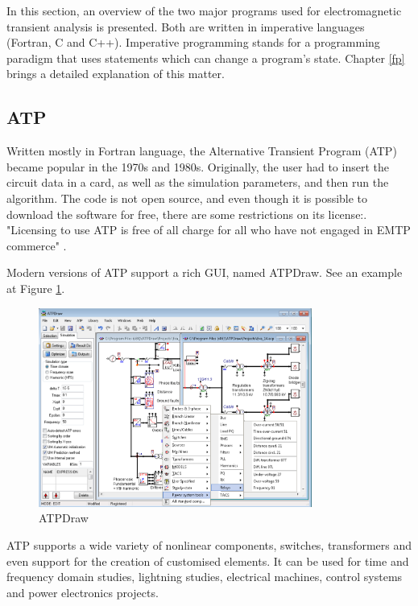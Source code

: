 In this section, an overview of the two major programs used for electromagnetic transient analysis is presented. Both are written in imperative languages (Fortran, C and C++). Imperative programming stands for a programming paradigm that uses statements which can change a program's state. Chapter \ref{fp} brings a detailed explanation of this matter.

\subsection{ATP}

Written mostly in Fortran language, the Alternative Transient Program (ATP) \cite{atpsite} became popular in the 1970s and 1980s. Originally, the user had to insert the circuit data in a card, as well as the simulation parameters, and then run the algorithm. The code is not open source, and even though it is possible to download the software for free, there are some restrictions on its license:. "Licensing to use ATP is free of all charge for all who have not engaged in EMTP commerce" \cite{atplic}. 

Modern versions of ATP support a rich GUI, named ATPDraw. See an example at Figure \ref{atpdraw}.

\begin{figure}[H]
   \centering
   \includegraphics[width=0.8\textwidth]{img/atpdraw.png}
   \caption{ATPDraw}
   \label{atpdraw}
\end{figure}
\cite{atpsiteim}

ATP supports a wide variety of nonlinear components, switches, transformers and even support for the creation of customised elements. It can be used for time and frequency domain studies, lightning studies, electrical machines, control systems and power electronics projects.

